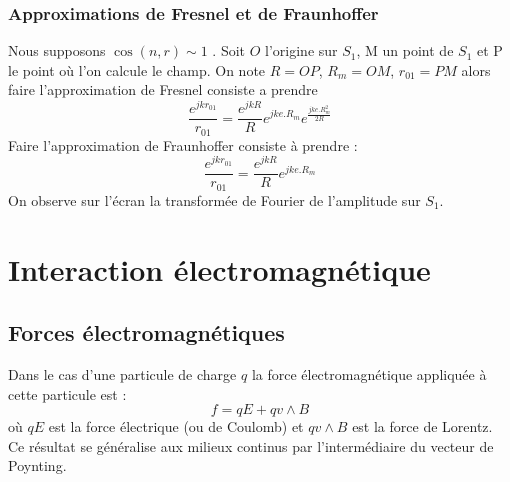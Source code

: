 \documentclass[12pt]{book}
\begin{document}
\subsubsection{Approximations de Fresnel et de Fraunhoffer}
Nous supposons $\cos(n,r)\sim 1$ . Soit $O$ l'origine sur $S_1$, M un
point de $S_1$ et P le point o\`u l'on calcule le champ. On note $R=OP$,
$R_m=OM$, $r_{01}=PM$ alors faire l'approximation de
Fresnel consiste a
prendre 
\begin{equation}
\frac{e^{jkr_{01}}}{r_{01}}=\frac{e^{jkR}}{R}e^{jke.R_m}e^{\frac{jke.R_m^2}{2R}}
\end{equation}
Faire l'approximation de Fraunhoffer  consiste \`a prendre : 
\begin{equation}
\frac{e^{jkr_{01}}}{r_{01}}=\frac{e^{jkR}}{R}e^{jke.R_m}
\end{equation}
On observe sur l'\'ecran la transform\'ee de Fourier de l'amplitude sur
$S_1$.







\section{Interaction \'electromagn\'etique}
\subsection{Forces \'electromagn\'etiques}
Dans le cas d'une particule de charge $q$ la force
\'electromagn\'etique appliqu\'ee \`a cette particule est :
\begin{equation}
f=qE+qv\wedge B
\end{equation}
o\`u $qE$ est la force \'electrique (ou de Coulomb) et $qv\wedge B$
est la force de Lorentz.
Ce r\'esultat se g\'en\'eralise aux milieux continus par
l'interm\'ediaire du vecteur de Poynting.
\end{document}

